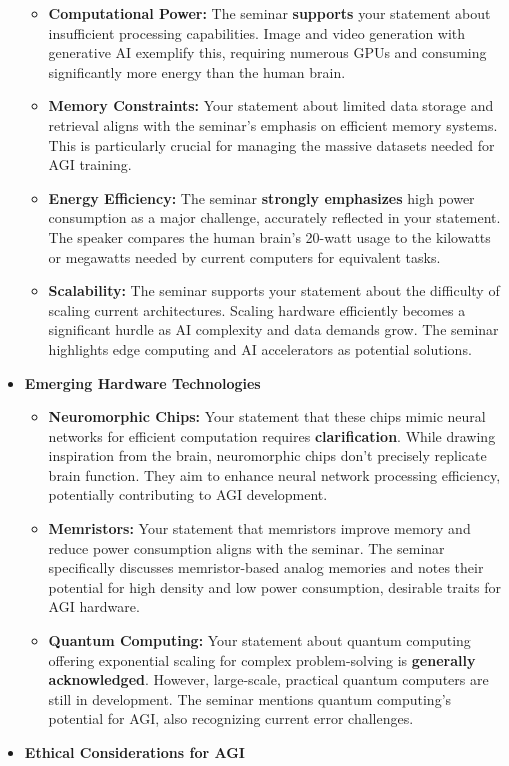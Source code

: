 \documentclass[
]{article}
\begin{document}
\begin{itemize}
\begin{itemize}
  \item
    \textbf{Computational Power:} The seminar \textbf{supports} your
    statement about insufficient processing capabilities. Image and
    video generation with generative AI exemplify this, requiring
    numerous GPUs and consuming significantly more energy than the human
    brain.
  \item
    \textbf{Memory Constraints:} Your statement about limited data
    storage and retrieval aligns with the seminar's emphasis on
    efficient memory systems. This is particularly crucial for managing
    the massive datasets needed for AGI training.
  \item
    \textbf{Energy Efficiency:} The seminar \textbf{strongly emphasizes}
    high power consumption as a major challenge, accurately reflected in
    your statement. The speaker compares the human brain's 20-watt usage
    to the kilowatts or megawatts needed by current computers for
    equivalent tasks.
  \item
    \textbf{Scalability:} The seminar supports your statement about the
    difficulty of scaling current architectures. Scaling hardware
    efficiently becomes a significant hurdle as AI complexity and data
    demands grow. The seminar highlights edge computing and AI
    accelerators as potential solutions.
  \end{itemize}
\item
  \textbf{Emerging Hardware Technologies}

  \begin{itemize}
  
  \item
    \textbf{Neuromorphic Chips:} Your statement that these chips mimic
    neural networks for efficient computation requires
    \textbf{clarification}. While drawing inspiration from the brain,
    neuromorphic chips don't precisely replicate brain function. They
    aim to enhance neural network processing efficiency, potentially
    contributing to AGI development.
  \item
    \textbf{Memristors:} Your statement that memristors improve memory
    and reduce power consumption aligns with the seminar. The seminar
    specifically discusses memristor-based analog memories and notes
    their potential for high density and low power consumption,
    desirable traits for AGI hardware.
  \item
    \textbf{Quantum Computing:} Your statement about quantum computing
    offering exponential scaling for complex problem-solving is
    \textbf{generally acknowledged}. However, large-scale, practical
    quantum computers are still in development. The seminar mentions
    quantum computing's potential for AGI, also recognizing current
    error challenges.
  \end{itemize}
\item
  \textbf{Ethical Considerations for AGI}


\end{itemize}
\end{document}
